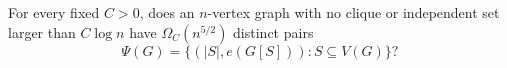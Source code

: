 For every fixed \(C>0\), does an \(n\)-vertex graph with no clique or
independent set larger than \(C\log n\) have
\(\Omega_C(n^{5/2})\) distinct pairs
\[
 \Psi(G)=\{(|S|,e(G[S])):S\subseteq V(G)\}?
\]
